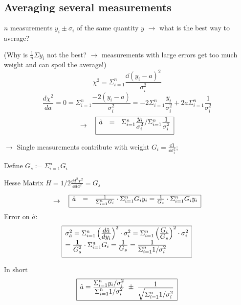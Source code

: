 \subsection{Averaging several measurements}
%
\renewcommand{\baselinestretch}{1.1}
\Large
$n$ measurements $y_i\pm \sigma_i$ of the same quantity
$y$ $\rightarrow$ what is the best way to average?
%

\noindent
(Why is $\frac{1}{n} \Sigma y_i$ not the best? $\rightarrow$
measurements with large errors get too much weight and can
spoil the average!)
%
\[ \chi^2 = \Sigma_{i=1}^n \frac{\dd (y_i -a)^2}{\sigma_i^2} \]
%
\[ \frac{d\chi^2}{da} = 0 = \Sigma_{i=1}^{n} \frac{-2 (y_i - a)}{\sigma_i^2}
 = -2 \Sigma_{i=1}^{n} \frac{y_i}{\sigma_i^2} + 
    2 a \Sigma_{i=1}^{n} \frac{1}{\sigma_i^2}
\]
%
\[
\rightarrow \quad 
\begin{array}{|lll|}
\hline
\hat{a} & = & \Sigma_{i=1}^n \frac{\displaystyle y_i}{\displaystyle \sigma_i^2} /  \Sigma_{i=1}^n \frac{\displaystyle 1}{\displaystyle \sigma_i^2} 
\\[4mm]
\hline
\end{array}
\]
%

$\rightarrow$ Single measurements contribute with weight 
$G_i = \frac{\dd 1}{\dd \sigma_i^2}$; 

Define $G_s:= \Sigma_{i=1}^{n} G_i$ 

Hesse Matrix $H = 1/2 \frac{\dd d^2\chi^2}{\dd da^2} = G_s$
%
 
\[
\rightarrow \quad 
\begin{array}{|lll|}
\hline
\hat{a} & = & \frac{1}{\Sigma_{i=1}^n G_i}  \cdot 
\Sigma_{i=1}^n G_i y_i = \frac{1}{G_s} \cdot \Sigma_{i=1}^n G_i y_i
\\[2mm]
\hline
\end{array}
\]
%
Error on $\hat{a}$: 
%
\[ 
\begin{array}{|l|}
\hline
\sigma_{\hat{a}}^2 = \Sigma_{i=1}^n \left( \frac{\displaystyle d\hat{a}}{\displaystyle dy_i}\right)^2 
\cdot \sigma_i^2 = 
\Sigma_{i=1}^n \left( \frac{\displaystyle G_i}{\displaystyle G_s}\right)^2 
\cdot \sigma_i^2 \\
= 
\frac{\displaystyle 1}{\displaystyle G_s^2} \cdot \Sigma_{i=1}^n G_i = \frac{\displaystyle 1}{\displaystyle G_s} = 
\frac{\displaystyle 1}{\displaystyle \Sigma_{i=1}^n 1/\sigma_i^2} 
\\[4mm]
\hline
\end{array}
\]

In short
\[ 
\begin{array}{|l|}
\hline
\hat{a} = \frac{ \displaystyle \Sigma_{i=1}^n y_i/\sigma_i^2}{\displaystyle
 \Sigma_{i=1}^n 1/\sigma_i^2} \; \pm \; \frac{\displaystyle 1}{\displaystyle 
\sqrt{\Sigma_{i=1}^n 1/\sigma_i^2} }
\\[4mm]
\hline
\end{array}
\]




